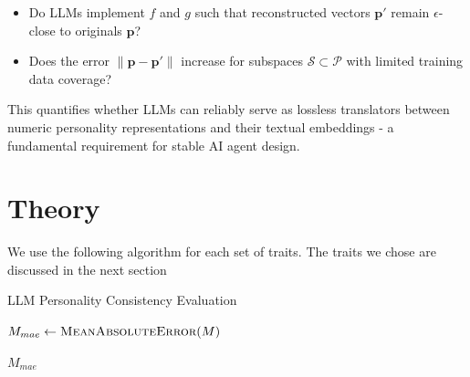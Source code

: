 \documentclass[12pt]{article}
\begin{document}
\begin{itemize}
    \item Do LLMs implement $f$ and $g$ such that reconstructed vectors $\mathbf{p'}$ remain $\epsilon$-close to originals $\mathbf{p}$?
    \item Does the error $\|\mathbf{p} - \mathbf{p'}\|$ increase for subspaces $\mathcal{S} \subset \mathcal{P}$ with limited training data coverage?
\end{itemize}

This quantifies whether LLMs can reliably serve as lossless translators between numeric personality representations and their textual embeddings - a fundamental requirement for stable AI agent design.

\section{Theory}

We use the following algorithm for each set of traits. The traits we chose are discussed in the next section



\begin{algorithm}[H]
\caption{LLM Personality Consistency Evaluation}

\SetAlgoLined
\DontPrintSemicolon



$M_{mae} \gets \Call{MeanAbsoluteError}{M}$\;

\Return $M_{mae}$\;


\end{algorithm}
\end{document}
